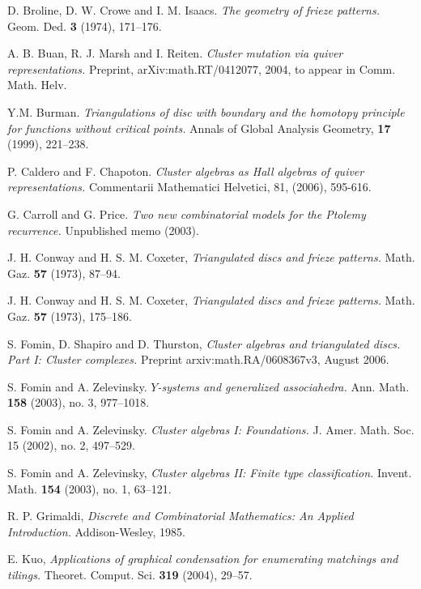 \documentclass[a4paper]{amsart}
\begin{document}
\begin{thebibliography}{CoCo73b}

D. Broline, D. W. Crowe and I. M. Isaacs.
\textit{The geometry of frieze patterns.}
Geom. Ded. \textbf{3} (1974), 171--176.

A. B. Buan, R. J. Marsh and I. Reiten.
\textit{Cluster mutation via quiver representations.}
Preprint, arXiv:math.RT/0412077, 2004, to appear in Comm. Math. Helv.

Y.M. Burman.
\textit{Triangulations of disc with boundary and the homotopy principle for
functions without critical points.}
Annals of Global Analysis Geometry,
\textbf{17} (1999), 221--238.

P. Caldero and F. Chapoton.
\textit{Cluster algebras as Hall algebras of quiver representations.}
Commentarii Mathematici Helvetici, 81, (2006), 595-616.

G. Carroll and G. Price.
\textit{Two new combinatorial models for the Ptolemy recurrence.}
Unpublished memo (2003).

J. H. Conway and H. S. M. Coxeter,
\textit{Triangulated discs and frieze patterns.}
Math. Gaz. \textbf{57} (1973), 87--94.

J. H. Conway and H. S. M. Coxeter,
\textit{Triangulated discs and frieze patterns.}
Math. Gaz. \textbf{57} (1973), 175--186.

S. Fomin, D. Shapiro and D. Thurston,
\textit{Cluster algebras and triangulated discs. Part I: Cluster complexes.}
Preprint arxiv:math.RA/0608367v3, August 2006.

S. Fomin and A. Zelevinsky.
\textit{$Y$-systems and generalized associahedra.}
Ann. Math. \textbf{158} (2003), no. 3,  977--1018.

S. Fomin and A. Zelevinsky.
\textit{Cluster algebras I: Foundations.}
J. Amer. Math. Soc. 15 (2002), no. 2, 497--529.

S. Fomin and A. Zelevinsky,
\textit{Cluster algebras II: Finite type classification.}
Invent. Math. \textbf{154} (2003), no. 1, 63--121.

R. P. Grimaldi,
\textit{Discrete and Combinatorial Mathematics: An Applied Introduction.}
Addison-Wesley, 1985.

E. Kuo,
\textit{Applications of graphical condensation for enumerating matchings
and tilings.}
Theoret. Comput. Sci. \textbf{319} (2004), 29--57.


\end{thebibliography}
\end{document}
